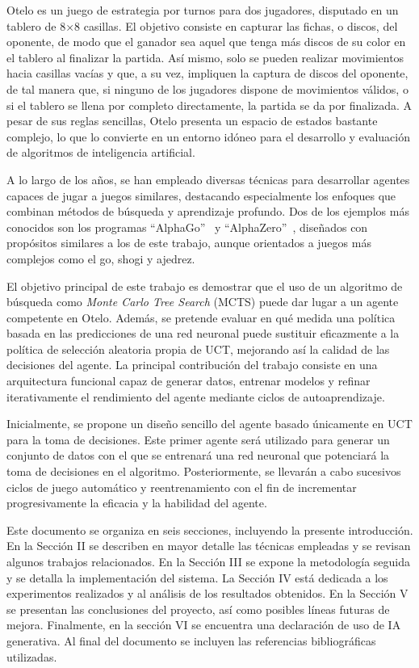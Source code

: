 \documentclass[conference,a4paper]{IEEEtran}
\begin{document}
Otelo es un juego de estrategia por turnos para dos jugadores, disputado en un tablero de 8×8 casillas. 
El objetivo consiste en capturar las fichas, o discos, del oponente, de modo que el ganador sea aquel que tenga más 
discos de su color en el tablero al finalizar la partida. Así mismo, solo se pueden realizar movimientos hacia casillas vacías 
y que, a su vez, impliquen la captura de discos del oponente, de tal manera que, si ninguno de los jugadores dispone de 
movimientos válidos, o si el tablero se llena por completo directamente, la partida se da por finalizada. A pesar de sus reglas sencillas, 
Otelo presenta un espacio de estados bastante complejo, lo que lo convierte en un entorno idóneo para el desarrollo y evaluación 
de algoritmos de inteligencia artificial.

A lo largo de los años, se han empleado diversas técnicas para desarrollar agentes capaces de jugar a juegos 
similares, destacando especialmente los enfoques que combinan métodos de búsqueda y aprendizaje profundo. 
Dos de los ejemplos más conocidos son los programas “AlphaGo”~\cite{b1} y “AlphaZero”~\cite{b2}, diseñados con propósitos similares 
a los de este trabajo, aunque orientados a juegos más complejos como el go, shogi y ajedrez.

El objetivo principal de este trabajo es demostrar que el uso de un algoritmo de búsqueda como \emph{Monte Carlo Tree Search} (MCTS) 
puede dar lugar a un agente competente en Otelo. Además, se pretende evaluar en qué medida una política basada en las predicciones 
de una red neuronal puede sustituir eficazmente a la política de selección aleatoria propia de UCT, mejorando así la calidad de las decisiones del agente. 
La principal contribución del trabajo consiste en una arquitectura funcional capaz de generar datos, entrenar modelos y refinar iterativamente el rendimiento del agente 
mediante ciclos de autoaprendizaje.

Inicialmente, se propone un diseño sencillo del agente basado únicamente en UCT para la toma de decisiones. Este primer agente será utilizado 
para generar un conjunto de datos con el que se entrenará una red neuronal que potenciará la toma de decisiones en el algoritmo. 
Posteriormente, se llevarán a cabo sucesivos ciclos de juego automático y reentrenamiento con el fin de incrementar progresivamente la eficacia y la habilidad del agente.

Este documento se organiza en seis secciones, incluyendo la presente introducción. En la Sección II se describen en mayor detalle las técnicas empleadas y se revisan algunos 
trabajos relacionados. En la Sección III se expone la metodología seguida y se detalla la implementación del sistema. La Sección IV está dedicada a los experimentos realizados 
y al análisis de los resultados obtenidos. En la Sección V se presentan las conclusiones del proyecto, así como posibles líneas futuras de mejora. Finalmente, en la sección VI 
se encuentra una declaración de uso de IA generativa. Al final del documento se incluyen las referencias bibliográficas utilizadas.
\end{document}
